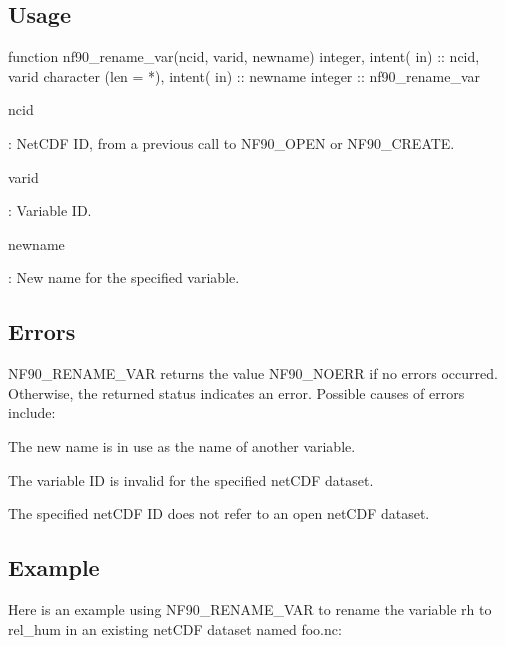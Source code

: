 \subsection*{Usage}


\begin{DoxyCode}
\textcolor{keyword}{function }nf90\_rename\_var(ncid, varid, newname)
  \textcolor{keywordtype}{integer},             \textcolor{keywordtype}{intent( in)} :: ncid, varid
  \textcolor{keywordtype}{character (len = *)}, \textcolor{keywordtype}{intent( in)} :: newname
  \textcolor{keywordtype}{integer}                          :: nf90\_rename\_var
\end{DoxyCode}


{\ttfamily ncid}

\+: Net\+C\+DF ID, from a previous call to N\+F90\+\_\+\+O\+P\+EN or N\+F90\+\_\+\+C\+R\+E\+A\+TE.

{\ttfamily varid}

\+: Variable ID.

{\ttfamily newname}

\+: New name for the specified variable.

\subsection*{Errors}

N\+F90\+\_\+\+R\+E\+N\+A\+M\+E\+\_\+\+V\+AR returns the value N\+F90\+\_\+\+N\+O\+E\+RR if no errors occurred. Otherwise, the returned status indicates an error. Possible causes of errors include\+:


\begin{DoxyItemize}
\item The new name is in use as the name of another variable.
\item The variable ID is invalid for the specified net\+C\+DF dataset.
\item The specified net\+C\+DF ID does not refer to an open net\+C\+DF dataset.
\end{DoxyItemize}

\subsection*{Example}

Here is an example using N\+F90\+\_\+\+R\+E\+N\+A\+M\+E\+\_\+\+V\+AR to rename the variable rh to rel\+\_\+hum in an existing net\+C\+DF dataset named foo.\+nc\+:


